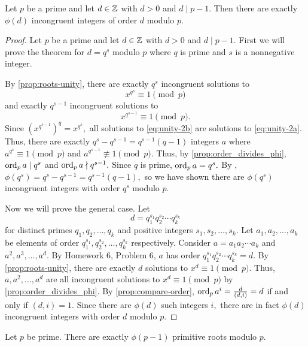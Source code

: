 \documentclass{ximera}
\begin{document}
\begin{theorem}\label{thm:number-element-order-d}
    Let $p$ be a prime and let $d\in\mathbb Z$ with $d>0$ and $d\mid p-1.$ Then there are exactly $\phi(d)$ incongruent integers of order $d$ modulo $p.$
    \begin{proof}
        Let $p$ be a prime and let $d\in\mathbb Z$ with $d>0$ and $d\mid p-1.$ First we will prove the theorem for $d=q^s$ modulo $p$ where $q$ is prime and $s$ is a nonnegative integer.
    
        By \cref{prop:roots-unity}, there are exactly $q^s$ incongruent solutions to 
        \begin{equation}\label{eq:unity-2a}
            x^{q^s}\equiv 1\pmod{p}
        \end{equation} and exactly $q^{s-1}$ incongruent solutions to 
        \begin{equation}\label{eq:unity-2b}
            x^{q^{s-1}}\equiv 1\pmod{p}.
        \end{equation}
        Since $(x^{q^{s-1}})^q=x^{q^s},$ all solutions to \eqref{eq:unity-2b} are solutions to \eqref{eq:unity-2a}. 
        Thus, there are exactly $q^s-q^{s-1}=q^{s-1}(q-1)$ integers $a$ where $a^{q^s}\equiv 1\pmod{p}$ and $a^{q^{s-1}}\not\equiv 1\pmod{p}.$ Thus, by \cref{prop:order_divides_phi}, $\operatorname{ord}_p a \mid q^s$ and $\operatorname{ord}_p a\nmid q^{s-1}.$ Since $q$ is prime, $\operatorname{ord}_p a =q^s.$ By , $\phi(q^s)=q^s-q^{s-1}=q^{s-1}(q-1),$ so we have shown there are $\phi(q^s)$ incongruent integers with order $q^s$ modulo $p$.
    
        Now we will prove the general case. Let 
        \[d=q_1^{s_1}q_2^{s_2}\cdots q_k^{s_k}\]
        for distinct primes $q_1,q_2,\dots,q_k$ and positive integers $s_1,s_2,\dots,s_k.$ Let $a_1,a_2,\dots,a_k$ be elements of order $q_1^{s_1},q_2^{s_2},\dots, q_k^{s_k}$ respectively.
        Consider $a=a_1a_2\cdots a_k$ and $a^2, a^3,\dots,a^d$. By Homework 6, Problem 6, $a$ has order $q_1^{s_1}q_2^{s_2}\cdots q_k^{s_k}=d.$ 
        By \cref{prop:roots-unity}, there are exactly $d$ solutions to $x^d\equiv 1\pmod{p}$. 
        Thus, $a, a^2,\dots,a^d$ are all incongruent solutions to $x^d\equiv 1\pmod{p}$ by \cref{prop:order_divides_phi}. 
        By \cref{prop:compare-order},
        $\operatorname{ord}_p a^i=\frac{d}{(d,i)}=d$ if and only if $(d,i)=1.$ Since there are $\phi(d)$ such integers $i,$ there are in fact $\phi(d)$ incongruent integers with order $d$ modulo $p.$
    \end{proof}
\end{theorem}





\begin{corollary}\label{cor:number-prime-roots}
    Let $p$ be prime. There are exactly $\phi(p-1)$ primitive roots modulo $p.$
\end{corollary}


\end{document}
